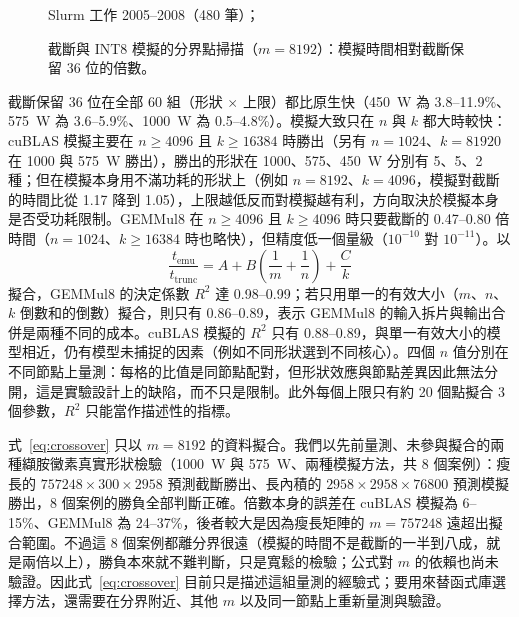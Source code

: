 \begin{figure}[tbp]
\centering
{}
\caption[截斷與 INT8 模擬的分界點掃描]{截斷與 INT8 模擬的分界點掃描（$m = 8192$）：模擬時間相對截斷保留 36 位的倍數。}\label{fig:crossover}
\begin{figsource}Slurm 工作 2005–2008（480 筆）；\end{figsource}
\end{figure}

截斷保留 36 位在全部 60 組（形狀 $\times$ 上限）都比原生快（450~W 為 3.8–11.9\%、575~W 為 3.6–5.9\%、1000~W 為 0.5–4.8\%）。模擬大致只在 $n$ 與 $k$ 都大時較快：cuBLAS 模擬主要在 $n \ge 4096$ 且 $k \ge 16384$ 時勝出（另有 $n = 1024$、$k = 81920$ 在 1000 與 575~W 勝出），勝出的形狀在 1000、575、450~W 分別有 5、5、2 種；但在模擬本身用不滿功耗的形狀上（例如 $n = 8192$、$k = 4096$，模擬對截斷的時間比從 1.17 降到 1.05），上限越低反而對模擬越有利，方向取決於模擬本身是否受功耗限制。GEMMul8 在 $n \ge 4096$ 且 $k \ge 4096$ 時只要截斷的 0.47–0.80 倍時間（$n = 1024$、$k \ge 16384$ 時也略快），但精度低一個量級（$10^{-10}$ 對 $10^{-11}$）。以
\begin{equation}
  \frac{t_{\mathrm{emu}}}{t_{\mathrm{trunc}}} = A + B\left(\frac{1}{m} + \frac{1}{n}\right) + \frac{C}{k}
  \label{eq:crossover}
\end{equation}
擬合，GEMMul8 的決定係數 $R^{2}$ 達 0.98–0.99；若只用單一的有效大小（$m$、$n$、$k$ 倒數和的倒數）擬合，則只有 0.86–0.89，表示 GEMMul8 的輸入拆片與輸出合併是兩種不同的成本。cuBLAS 模擬的 $R^{2}$ 只有 0.88–0.89，與單一有效大小的模型相近，仍有模型未捕捉的因素（例如不同形狀選到不同核心）。四個 $n$ 值分別在不同節點上量測：每格的比值是同節點配對，但形狀效應與節點差異因此無法分開，這是實驗設計上的缺陷，而不只是限制。此外每個上限只有約 20 個點擬合 3 個參數，$R^{2}$ 只能當作描述性的指標。

式~\eqref{eq:crossover} 只以 $m = 8192$ 的資料擬合。我們以先前量測、未參與擬合的兩種纈胺黴素真實形狀檢驗（1000~W 與 575~W、兩種模擬方法，共 8 個案例）：瘦長的 $757248\times300\times2958$ 預測截斷勝出、長內積的 $2958\times2958\times76800$ 預測模擬勝出，8 個案例的勝負全部判斷正確。倍數本身的誤差在 cuBLAS 模擬為 6–15\%、GEMMul8 為 24–37\%，後者較大是因為瘦長矩陣的 $m = 757248$ 遠超出擬合範圍。不過這 8 個案例都離分界很遠（模擬的時間不是截斷的一半到八成，就是兩倍以上），勝負本來就不難判斷，只是寬鬆的檢驗；公式對 $m$ 的依賴也尚未驗證。因此式~\eqref{eq:crossover} 目前只是描述這組量測的經驗式；要用來替函式庫選擇方法，還需要在分界附近、其他 $m$ 以及同一節點上重新量測與驗證。

